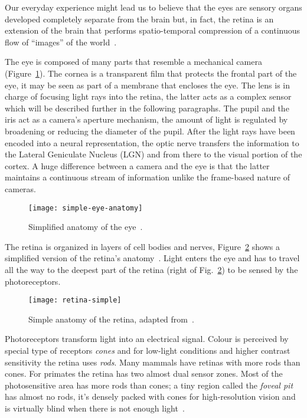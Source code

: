 Our everyday experience might lead us to believe that the eyes are sensory organs developed completely separate from the brain but, in fact, the retina is an extension of the brain that performs spatio-temporal compression of a continuous flow of ``images'' of the world~\cite{eye-brain-vision-hubel1995}.

The eye is composed of many parts that resemble a mechanical camera (Figure~\ref{fig:vision:eye}). The cornea is a transparent film that protects the frontal part of the eye, it may be seen as part of a membrane that encloses the eye. The lens is in charge of focusing light rays into the retina, the latter acts as a complex sensor which will be described further in the following paragraphs. The pupil and the iris act as a camera's aperture mechanism, the amount of light is regulated by broadening or reducing the diameter of the pupil. After the light rays have been encoded into a neural representation, the optic nerve transfers the information to the Lateral Geniculate Nucleus (LGN) and from there to the visual portion of the cortex. A huge difference between a camera and the eye is that the latter maintains a continuous stream of information unlike the frame-based nature of cameras.

\begin{figure}[htb]
  \begin{center}
    \texttt{[image: simple-eye-anatomy]}
    \caption{Simplified anatomy of the eye~\cite{webvision-images}.}
    \label{fig:vision:eye}
  \end{center}
\end{figure}

The retina is organized in layers of cell bodies and nerves,  Figure~\ref{fig:vision:simple-retina} shows a simplified version of the retina's anatomy~\cite{webvision-simple-retina}. Light enters the eye and has to travel all the way to the deepest part of the retina (right of Fig.~\ref{fig:vision:simple-retina}) to be sensed by the photoreceptors. 

\begin{figure}[h]
  \begin{center}
    \texttt{[image: retina-simple]}
    \caption{Simple anatomy of the retina, adapted from~\cite{webvision-images}.}
    \label{fig:vision:simple-retina}
  \end{center}
\end{figure}

Photoreceptors transform light into an electrical signal. Colour is perceived by special type of receptors \emph{cones} and for low-light conditions and higher contrast sensitivity the retina uses \emph{rods}. Many mammals have retinas with more rods than cones. For primates the retina has two almost dual sensor zones. Most of the photosensitive area has more rods than cones; a tiny region called the \emph{foveal pit} has almost no rods, it's densely packed with cones for high-resolution vision and is virtually blind when there is not enough light~\cite{eye-brain-vision-hubel1995}.

